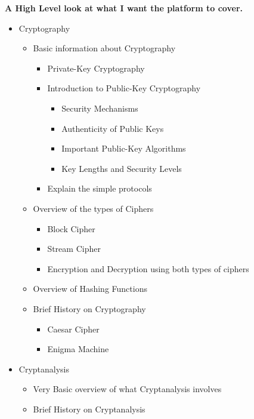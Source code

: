 \textbf{A High Level look at what I want the platform to cover.}
\begin{itemize}
\item{Cryptography
\begin{itemize}
\item{Basic information about Cryptography
\begin{itemize} %
\item{Private-Key Cryptography}
\item{Introduction to Public-Key Cryptography
\begin{itemize}
\item{Security Mechanisms}
\item{Authenticity of Public Keys}
\item{Important Public-Key Algorithms}
\item{Key Lengths and Security Levels}
\end{itemize}}
\item{Explain the simple protocols}
\end{itemize}}
\item{Overview of the types of Ciphers
\begin{itemize}
\item{Block Cipher}
\item{Stream Cipher}
\item{Encryption and Decryption using both types of ciphers}
\end{itemize}}
\item{Overview of Hashing Functions}
\item{Brief History on Cryptography
\begin{itemize}
\item{Caesar Cipher}
\item{Enigma Machine}
\end{itemize}}
\end{itemize}}
\item{Cryptanalysis
\begin{itemize}
\item{Very Basic overview of what Cryptanalysis involves}
\item{Brief History on Cryptanalysis}
\end{itemize}}
\end{itemize}

